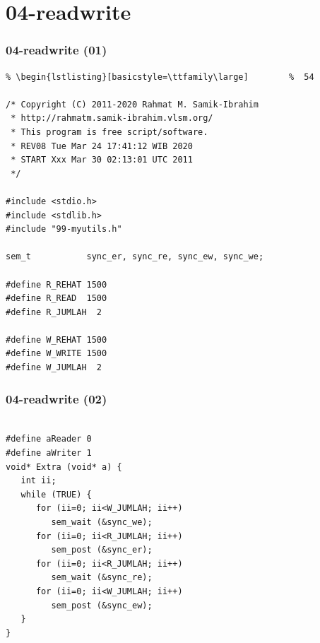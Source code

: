 \documentclass[aspectratio=169, xcolor=table, notheorems, hyperref={pdfpagelabels=false}]{beamer}
\begin{document}
\section{04-readwrite}
\begin{frame}[fragile]
\frametitle{04-readwrite (01)}
\begin{lstlisting}[basicstyle=\ttfamily\footnotesize] %  72
% \begin{lstlisting}[basicstyle=\ttfamily\small]        %  65
% \begin{lstlisting}[basicstyle=\ttfamily\large]        %  54

/* Copyright (C) 2011-2020 Rahmat M. Samik-Ibrahim
 * http://rahmatm.samik-ibrahim.vlsm.org/
 * This program is free script/software. 
 * REV08 Tue Mar 24 17:41:12 WIB 2020
 * START Xxx Mar 30 02:13:01 UTC 2011
 */

#include <stdio.h>
#include <stdlib.h>
#include "99-myutils.h"

sem_t           sync_er, sync_re, sync_ew, sync_we;

#define R_REHAT 1500
#define R_READ  1500
#define R_JUMLAH  2

#define W_REHAT 1500
#define W_WRITE 1500
#define W_JUMLAH  2

\end{lstlisting}
\end{frame}

\begin{frame}[fragile]
\frametitle{04-readwrite (02)}
\begin{lstlisting}[basicstyle=\ttfamily\large]        %  54

#define aReader 0
#define aWriter 1
void* Extra (void* a) {
   int ii;
   while (TRUE) {
      for (ii=0; ii<W_JUMLAH; ii++)
         sem_wait (&sync_we);
      for (ii=0; ii<R_JUMLAH; ii++)
         sem_post (&sync_er);
      for (ii=0; ii<R_JUMLAH; ii++)
         sem_wait (&sync_re);
      for (ii=0; ii<W_JUMLAH; ii++)
         sem_post (&sync_ew);
   }
}

\end{lstlisting}
\end{frame}
\end{document}
